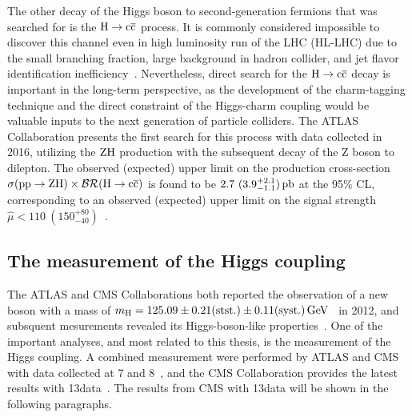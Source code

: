 The other decay of the Higgs boson to second-generation fermions that was searched for is the $\mathrm{H}\to\mathrm{c}\overline{\mathrm{c}}$ process. It is commonly considered impossible to discover this channel even in high luminosity run of the LHC (HL-LHC) due to the small branching fraction, large background in hadron collider, and jet flavor identification inefficiency~\cite{Perez:2015aoa,Perez:2015lra}. Nevertheless, direct search for the $\mathrm{H}\to\mathrm{c}\overline{\mathrm{c}}$ decay is important in the long-term perspective, as the development of the charm-tagging technique and the direct constraint of the Higgs-charm coupling would be valuable inputs to the next generation of particle colliders. The ATLAS Collaboration presents the first search for this process with data collected in 2016, utilizing the $\mathrm{Z}\mathrm{H}$ production with the subsequent decay of the Z boson to dilepton. The observed (expected) upper limit on the production cross-section $\sigma(\mathrm{p}\mathrm{p}\to\mathrm{Z}\mathrm{H})\times\mathcal{BR}(\mathrm{H}\to\mathrm{c}\overline{\mathrm{c}})$ is found to be $2.7\ (3.9^{+2.1}_{-1.1})\pb$ at the 95\% CL, corresponding to an observed (expected) upper limit on  the signal strength $\hat{\mu}<110\ (150^{+80}_{-40})$~\cite{Aaboud:2018fhh}.

\subsection{The measurement of the Higgs coupling}
The ATLAS and CMS Collaborations both reported the observation of a new boson with a mass of $m_{\mathrm{H}}=125.09\pm 0.21(\text{stst.})\pm 0.11(\text{syst.})\,\text{Ge\hspace{-.08em}V}$~\cite{Aad:2015zhl} in 2012, and subsquent mesurements revealed its Higgs-boson-like properties~\cite{Chatrchyan:2012jja,Khachatryan:2014kca,Aad:2012tfa,Chatrchyan:2012xdj,Chatrchyan:2013lba,Aad:2015gba,Khachatryan:2014jba,Aad:2013xqa}. One of the important analyses, and most related to this thesis, is the measurement of the Higgs coupling.  A combined measurement were performed by ATLAS and CMS with data collected at 7 and 8\TeV~\cite{Khachatryan:2016vau}, and the CMS Collaboration provides the latest results with 13\TeV data~\cite{CMS-PAS-HIG-17-031}. The results from CMS with 13\TeV data will be shown in the following paragraphs.

